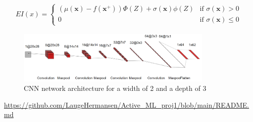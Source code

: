 \begin{gather}
    EI(x)=\begin{cases}
    (\mu(\mathbf{x})-f(\mathbf{x}^+))\Phi(Z)+\sigma(\mathbf{x})\phi(Z) & \text{if }\sigma(\mathbf{x})>0 \\
    0 & \text{if }\sigma(\mathbf{x})\leq 0
    \end{cases}
\end{gather}
\begin{figure}[H]
    \centering
    \includegraphics[width=0.85\textwidth]{Images/CNN_arch.png}
    \caption{CNN network architecture for a width of 2 and a depth of 3}
    \label{fig:cnn_architecture}
\end{figure}
\url{https://github.com/LaugeHermansen/Active_ML_proj1/blob/main/README.md}

